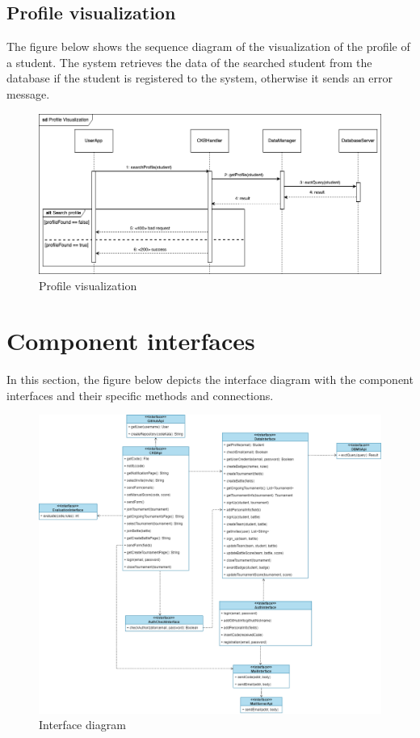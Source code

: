\subsection{Profile visualization}
The figure below shows the sequence diagram of the visualization of the profile of a student. 
The system retrieves the data of the searched student from the database if the student is registered to the system, otherwise it sends an 
error message.\\
\begin{figure}[H]
    \centering
    \includegraphics[width=1\textwidth]{images/seq_diagrams/ProfileVis_DD.png}
    \caption{Profile visualization}
\end{figure}
\clearpage

\section{Component interfaces}
In this section, the figure below depicts the interface diagram with the component interfaces and their specific methods and connections.
\begin{figure}[H]
    \centering
    \includegraphics[width=1\textwidth]{images/Interface_diagram.png}
    \caption{Interface diagram}
\end{figure}
\clearpage


